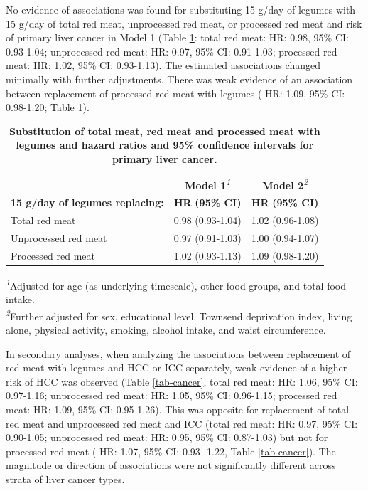 \documentclass[nutrients,article,submit,moreauthors,pdftex]{Definitions/mdpi}
\begin{document}
No evidence of associations was found for substituting 15 g/day of
legumes with 15 g/day of total red meat, unprocessed red meat, or
processed red meat and risk of primary liver cancer in Model 1 (Table
\ref{tab-main}: total red meat: HR: 0.98, 95\% CI: 0.93-1.04;
unprocessed red meat: HR: 0.97, 95\% CI: 0.91-1.03; processed red meat:
HR: 1.02, 95\% CI: 0.93-1.13). The estimated associations changed
minimally with further adjustments. There was weak evidence of an
association between replacement of processed red meat with legumes ( HR:
1.09, 95\% CI: 0.98-1.20; Table \ref{tab-main}).

\begin{table}[t]
\caption{{\small \textbf{Substitution of total meat, red meat and processed meat with legumes and hazard ratios and 95\% confidence intervals for primary liver cancer.}}}\label{tab-main}
\begin{tabular*}{1\linewidth}{@{\extracolsep{\fill}}lcc}
\toprule
 & {\bfseries \textbf{Model 1}}\textsuperscript{\textit{1}} & {\bfseries \textbf{Model 2}}\textsuperscript{\textit{2}} \\ 
\cmidrule(lr){2-2} \cmidrule(lr){3-3}
\textbf{15 g/day of legumes replacing:} & \textbf{HR} \textbf{(95\% CI)} & \textbf{HR} \textbf{(95\% CI)} \\ 
\midrule\addlinespace[2.5pt]
Total red meat & 0.98 (0.93-1.04) & 1.02 (0.96-1.08) \\ 
Unprocessed red meat & 0.97 (0.91-1.03) & 1.00 (0.94-1.07) \\ 
Processed red meat & 1.02 (0.93-1.13) & 1.09 (0.98-1.20) \\ 
\bottomrule
\end{tabular*}
\begin{minipage}{\linewidth}
\textsuperscript{\textit{1}}Adjusted for age (as underlying timescale), other food groups, and total food intake.\\
\textsuperscript{\textit{2}}Further adjusted for sex, educational level, Townsend deprivation index, living alone, physical activity, smoking, alcohol intake, and waist circumference.\\
\end{minipage}
\end{table}

In secondary analyses, when analyzing the associations between
replacement of red meat with legumes and HCC or ICC separately, weak
evidence of a higher risk of HCC was observed (Table \ref{tab-cancer},
total red meat: HR: 1.06, 95\% CI: 0.97-1.16; unprocessed red meat: HR:
1.05, 95\% CI: 0.96-1.15; processed red meat: HR: 1.09, 95\% CI:
0.95-1.26). This was opposite for replacement of total red meat and
unprocessed red meat and ICC (total red meat: HR: 0.97, 95\% CI:
0.90-1.05; unprocessed red meat: HR: 0.95, 95\% CI: 0.87-1.03) but not
for processed red meat ( HR: 1.07, 95\% CI: 0.93- 1.22, Table
\ref{tab-cancer}). The magnitude or direction of associations were not
significantly different across strata of liver cancer types.
\end{document}
